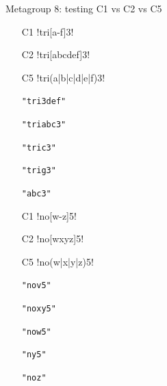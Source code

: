 \vspace{-2mm}
Metagroup 8: testing C1 vs C2 vs C5
\vspace{-5mm}
\begin{multicols}{2}
\begin{itemize}[noitemsep,topsep=0pt]
\item[C1] \cverb!tri[a-f]3!
\item[C2] \cverb!tri[abcdef]3!
\item[C5] \cverb!tri(a|b|c|d|e|f)3!
\item[] \verb|"tri3def"|
\item[] \verb|"triabc3"|
\item[] \verb|"tric3"|
\item[] \verb|"trig3"|
\item[] \verb|"abc3"|
\item[C1] \cverb!no[w-z]5!
\item[C2] \cverb!no[wxyz]5!
\item[C5] \cverb!no(w|x|y|z)5!
\item[] \verb|"nov5"|
\item[] \verb|"noxy5"|
\item[] \verb|"now5"|
\item[] \verb|"ny5"|
\item[] \verb|"noz"|
\end{itemize}
\end{multicols}
\pagebreak

